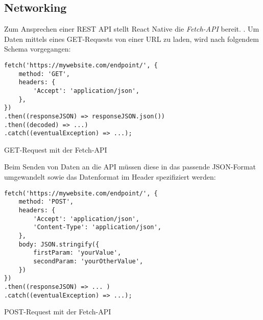 \subsection{Networking}
Zum Ansprechen einer REST API stellt React Native die \textit{Fetch-API} bereit. \cite{facebook_inc._fetch_2017}. Um Daten mittels eines GET-Requests von einer URL zu laden, wird nach folgendem Schema vorgegangen:
\begin{listing}[H]
    \begin{verbatim}
fetch('https://mywebsite.com/endpoint/', {
    method: 'GET',
    headers: {
        'Accept': 'application/json',
    },
})
.then((responseJSON) => responseJSON.json())
.then((decoded) => ...)
.catch((eventualException) => ...);
    \end{verbatim}
    \caption{GET-Request mit der Fetch-API \cite{facebook_inc._fetch_2017}}
    \label{lst:get_fetch}
\end{listing}

Beim Senden von Daten an die API müssen diese in das passende JSON-Format umgewandelt sowie das Datenformat im Header spezifiziert werden:

\begin{listing}[H]
    \begin{verbatim}
fetch('https://mywebsite.com/endpoint/', {
    method: 'POST',
    headers: {
        'Accept': 'application/json',
        'Content-Type': 'application/json',
    },
    body: JSON.stringify({
        firstParam: 'yourValue',
        secondParam: 'yourOtherValue',
    })
})
.then((responseJSON) => ... )
.catch((eventualException) => ...);
    \end{verbatim}
    \caption{POST-Request mit der Fetch-API \cite{facebook_inc._fetch_2017}}
    \label{lst:fetch}
\end{listing}

